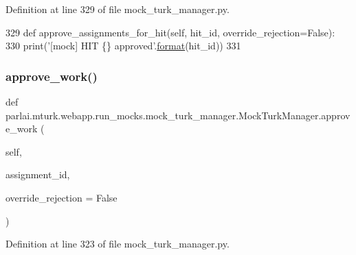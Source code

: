Definition at line 329 of file mock\+\_\+turk\+\_\+manager.\+py.


\begin{DoxyCode}
329     \textcolor{keyword}{def }approve\_assignments\_for\_hit(self, hit\_id, override\_rejection=False):
330         print(\textcolor{stringliteral}{'[mock] HIT \{\} approved'}.\hyperlink{namespaceparlai_1_1chat__service_1_1services_1_1messenger_1_1shared__utils_a32e2e2022b824fbaf80c747160b52a76}{format}(hit\_id))
331 
\end{DoxyCode}
\mbox{\label{classparlai_1_1mturk_1_1webapp_1_1run__mocks_1_1mock__turk__manager_1_1MockTurkManager_a05fc62c918aa6f6a9d3019a653637197}} 
\subsubsection{\texorpdfstring{approve\+\_\+work()}{approve\_work()}}
{\footnotesize\ttfamily def parlai.\+mturk.\+webapp.\+run\+\_\+mocks.\+mock\+\_\+turk\+\_\+manager.\+Mock\+Turk\+Manager.\+approve\+\_\+work (\begin{DoxyParamCaption}\item[{}]{self,  }\item[{}]{assignment\+\_\+id,  }\item[{}]{override\+\_\+rejection = {\ttfamily False} }\end{DoxyParamCaption})}



Definition at line 323 of file mock\+\_\+turk\+\_\+manager.\+py.



